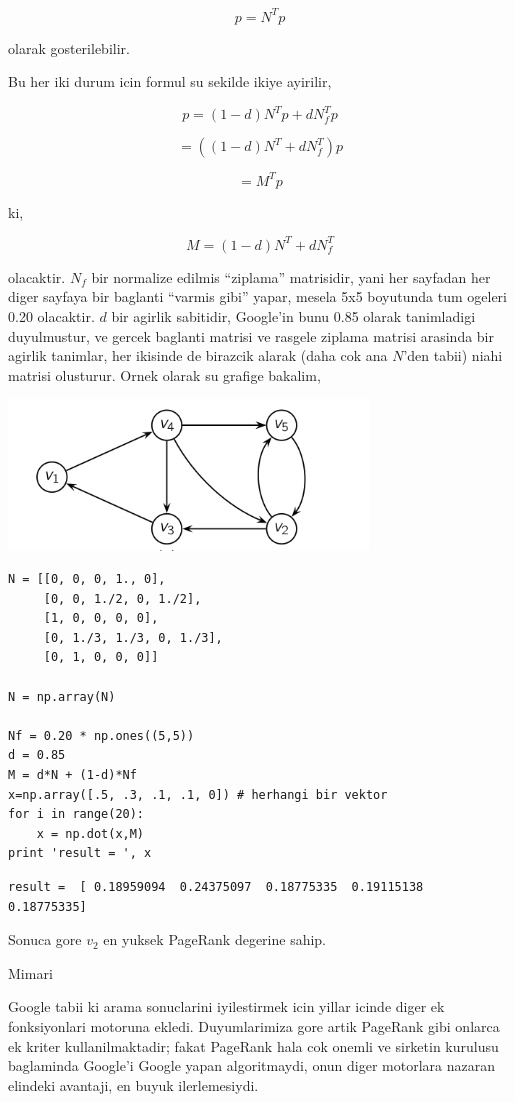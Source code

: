 \documentclass[12pt,fleqn]{article}\usepackage{../common}
\begin{document}
$$ p = N^Tp $$ 

olarak gosterilebilir. 

Bu her iki durum icin formul su sekilde ikiye ayirilir,

$$ p = (1-d)N^Tp + dN_f^Tp $$

$$ = ((1-d)N^T + dN_f^T) p $$

$$ = M^Tp $$

ki,

$$M = (1-d)N^T + dN_f^T$$ 

olacaktir. $N_f$ bir normalize edilmis ``ziplama'' matrisidir, yani her
sayfadan her diger sayfaya bir baglanti ``varmis gibi'' yapar, mesela 5x5
boyutunda tum ogeleri 0.20 olacaktir. $d$ bir agirlik sabitidir, Google'in
bunu 0.85 olarak tanimladigi duyulmustur, ve gercek baglanti matrisi ve
rasgele ziplama matrisi arasinda bir agirlik tanimlar, her ikisinde de
birazcik alarak (daha cok ana $N$'den tabii) niahi matrisi olusturur. Ornek
olarak su grafige bakalim, 

\includegraphics[height=4cm]{pg3.png}

\begin{verbatim}
N = [[0, 0, 0, 1., 0],
     [0, 0, 1./2, 0, 1./2],
     [1, 0, 0, 0, 0],
     [0, 1./3, 1./3, 0, 1./3],
     [0, 1, 0, 0, 0]]

N = np.array(N)

Nf = 0.20 * np.ones((5,5))
d = 0.85
M = d*N + (1-d)*Nf
x=np.array([.5, .3, .1, .1, 0]) # herhangi bir vektor
for i in range(20): 
    x = np.dot(x,M)
print 'result = ', x 
\end{verbatim}

\begin{verbatim}
result =  [ 0.18959094  0.24375097  0.18775335  0.19115138  0.18775335]
\end{verbatim}

Sonuca gore $v_2$ en yuksek PageRank degerine sahip. 

Mimari

Google tabii ki arama sonuclarini iyilestirmek icin yillar icinde diger ek
fonksiyonlari motoruna ekledi. Duyumlarimiza gore artik PageRank gibi
onlarca ek kriter kullanilmaktadir; fakat PageRank hala cok onemli ve
sirketin kurulusu baglaminda Google'i Google yapan algoritmaydi, onun diger
motorlara nazaran elindeki avantaji, en buyuk ilerlemesiydi.
\end{document}
